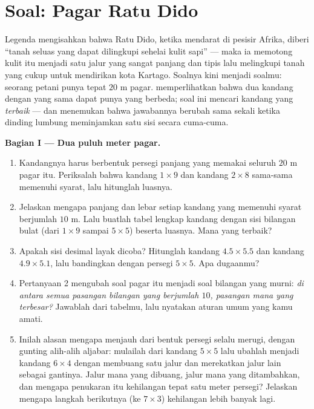 \section{Soal: Pagar Ratu Dido}

\begin{problem}
\label{pb:g6:measure:1}
Legenda mengisahkan bahwa Ratu Dido, ketika mendarat di pesisir
Afrika, diberi ``tanah seluas yang dapat dilingkupi sehelai kulit
sapi'' --- maka ia memotong kulit itu menjadi satu jalur yang sangat
panjang dan tipis lalu melingkupi tanah yang cukup untuk mendirikan
kota Kartago. Soalnya kini menjadi soalmu: seorang petani punya tepat
$20$ m pagar.  memperlihatkan bahwa dua kandang
dengan  yang sama dapat punya  yang berbeda; soal ini
mencari kandang yang \emph{terbaik} --- dan menemukan bahwa jawabannya
berubah sama sekali ketika dinding lumbung meminjamkan satu sisi
secara cuma-cuma.

\medskip
\noindent\textbf{Bagian I --- Dua puluh meter pagar.}
\begin{enumerate}
  \item Kandangnya harus berbentuk persegi panjang yang memakai
        seluruh $20$ m pagar itu. Periksalah bahwa kandang
        $1 \times 9$ dan kandang $2 \times 8$ sama-sama memenuhi
        syarat, lalu hitunglah luasnya.
  \item Jelaskan mengapa panjang dan lebar setiap kandang yang
        memenuhi syarat berjumlah $10$ m. Lalu buatlah tabel lengkap
        kandang dengan sisi bilangan bulat (dari $1 \times 9$ sampai
        $5 \times 5$) beserta luasnya. Mana yang terbaik?
  \item Apakah sisi desimal layak dicoba? Hitunglah  kandang
        $4.5 \times 5.5$ dan kandang $4.9 \times 5.1$, lalu
        bandingkan dengan persegi $5 \times 5$. Apa dugaanmu?
  \item Pertanyaan 2 mengubah soal pagar itu menjadi soal bilangan
        yang murni: \emph{di antara semua pasangan bilangan yang
        berjumlah $10$, pasangan mana yang  terbesar?}
        Jawablah dari tabelmu, lalu nyatakan aturan umum yang kamu
        amati.
  \item Inilah alasan mengapa menjauh dari bentuk persegi selalu
        merugi, dengan gunting alih-alih aljabar: mulailah dari
        kandang $5 \times 5$ lalu ubahlah menjadi kandang
        $6 \times 4$ dengan membuang satu jalur dan merekatkan jalur
        lain sebagai gantinya. Jalur mana yang dibuang, jalur mana
        yang ditambahkan, dan mengapa penukaran itu kehilangan tepat
        satu meter persegi? Jelaskan mengapa langkah berikutnya (ke
        $7 \times 3$) kehilangan lebih banyak lagi.
\end{enumerate}


\end{problem}
